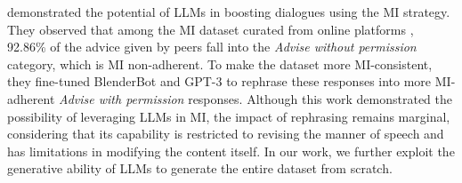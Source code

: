 \citet{welivita2023boosting} demonstrated the potential of LLMs in boosting dialogues using the MI strategy. They observed that among the MI dataset curated from online platforms \citep{welivita2022curating}, 92.86\% of the advice given by peers fall into the \textit{Advise without permission} category, which is MI non-adherent. To make the dataset more MI-consistent, they fine-tuned BlenderBot \citep{roller2021recipes} and GPT-3 \citep{brown2020language} to rephrase these responses into more MI-adherent \textit{Advise with permission} responses. Although this work demonstrated the possibility of leveraging LLMs in MI, the impact of rephrasing remains marginal, considering that its capability is restricted to revising the manner of speech and has limitations in modifying the content itself.
In our work, we further exploit the generative ability of LLMs to generate the entire dataset from scratch.




